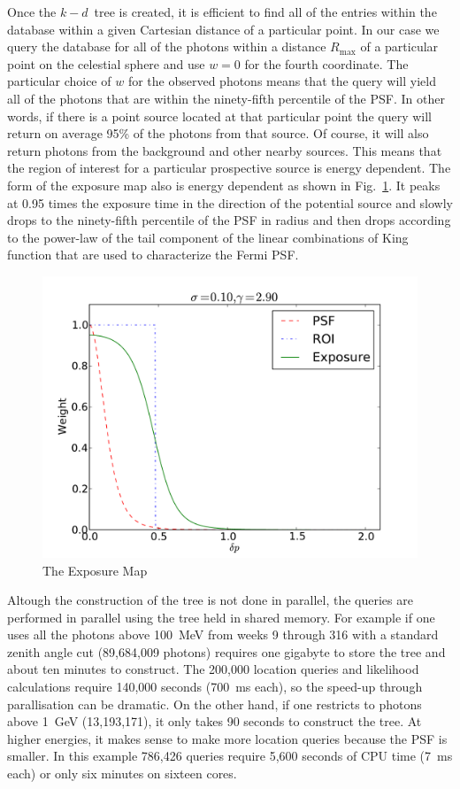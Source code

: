 \documentclass[useAMS,usenatbib]{mn2e}
\begin{document}
Once the $k-d$~tree is created, it is efficient to find all of the
entries within the database within a given Cartesian distance of a
particular point.  In our case we query the database for all of the
photons within a distance $R_\mathrm{max}$ of a particular point on
the celestial sphere and use $w=0$ for the fourth coordinate.  The
particular choice of $w$ for the observed photons means that the query
will yield all of the photons that are within the ninety-fifth
percentile of the PSF.  In other words, if there is a point source
located at that particular point the query will return on average 95\%
of the photons from that source.  Of course, it will also return
photons from the background and other nearby sources.  This means that
the region of interest for a particular prospective source is energy
dependent.  The form of the exposure map also is energy dependent as
shown in Fig.~\ref{fig:expmap}.  It peaks at 0.95 times the exposure
time in the direction of the potential source and slowly drops to the
ninety-fifth percentile of the PSF in radius and then drops according
to the power-law of the tail component of the linear combinations of
King function that are used to characterize the Fermi PSF. 
\begin{figure}
\includegraphics[width=\columnwidth]{expmap}
\caption{The Exposure Map}
\label{fig:expmap}
\end{figure}

Altough the construction of the tree is not done in parallel, the
queries are performed in parallel using the tree held in shared
memory.  For example if one uses all the photons above 100~MeV from
weeks 9 through 316 with a standard zenith angle cut (89,684,009
photons) requires one gigabyte to store the tree and about ten minutes
to construct.  The 200,000 location queries and likelihood
calculations require 140,000 seconds (700~ms each), so the
speed-up through parallisation can be dramatic.  On the other hand, if
one restricts to photons above 1~GeV (13,193,171), it only takes 90
seconds to construct the tree.  At higher energies, it makes sense to
make more location queries because the PSF is smaller.  In this
example 786,426 queries require 5,600 seconds of CPU time (7~ms each)
or only six minutes on sixteen cores.
\end{document}
